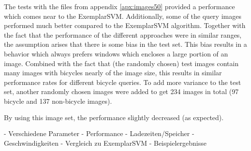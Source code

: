 The tests with the files from appendix \ref{apx:images50} provided a performance which comes near to the ExemplarSVM. Additionally, some of the query images performed much better compared to the ExemplarSVM algorithm. Together with the fact that the performance of the different approaches were in similar ranges, the assumption arises that there is some bias in the test set. This bias results in a behavior which always prefers windows which encloses a large portion of an image. Combined with the fact that (the randomly chosen) test images contain many images with bicycles nearly of the image size, this results in similar performance rates for different bicycle queries. To add more variance to the test set, another randomly chosen images were added to get 234 images in total (97 bicycle and 137 non-bicycle images).

By using this image set, the performance slightly decreased (as expected). 

- Verschiedene Parameter
- Performance
- Ladezeiten/Speicher
- Geschwindigkeiten
- Vergleich zu ExemplarSVM
- Beispielergebnisse
